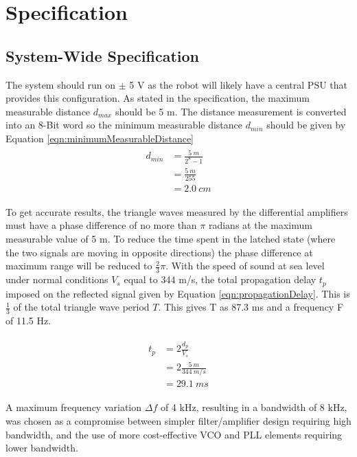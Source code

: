 \section{Specification}
\label{sec:specification}

\subsection{System-Wide Specification}
\label{sec:systemWideSpecification}
The system should run on $\pm$ 5 V as the robot will likely have a central PSU that provides this configuration.
As stated in the specification, the maximum measurable distance $d_{max}$ should be 5 m. 
The distance measurement is converted into an 8-Bit word so the minimum measurable distance $d_{min}$ should be given by Equation \eqref{eqn:minimumMeasurableDistance}
\
\begin{align}
    \begin{split}
        d_{min} & =  \frac{5\ m}{2^8-1}\\
                & =  \frac{5\ m}{255}\\
                & =   2.0\ cm
    \end{split}
    \label{eqn:minimumMeasurableDistance}
\end{align}

To get accurate results, the triangle waves measured by the differential amplifiers must have a phase difference of no more than \(\pi\) radians at the maximum measurable value of 5 m.
To reduce the time spent in the latched state (where the two signals are moving in opposite directions) the phase difference at maximum range will be reduced to \(\frac{2}{3}\pi\). 
With the speed of sound at sea level under normal conditions $V_{s}$ equal to 344 m/s, the total propagation delay $t_{p}$ imposed on the reflected signal given by Equation \eqref{eqn:propagationDelay}.
This is \(\frac{1}{3}\) of the total triangle wave period $T$. 
This gives T as 87.3 ms and a frequency F of 11.5 Hz.

\begin{align}
    \begin{split}
        t_{p} & = 2\frac{d_{p}}{V_{s}}\\
              & = 2\frac{5\ m}{344\ m/s}\\
              & = 29.1\ ms
    \end{split}
    \label{eqn:propagationDelay}
\end{align}

A maximum frequency variation $\Delta f$ of 4 kHz, resulting in a bandwidth of 8 kHz, was chosen as a compromise between simpler filter/amplifier design requiring high bandwidth, and the use of more cost-effective VCO and PLL elements requiring lower bandwidth.  

